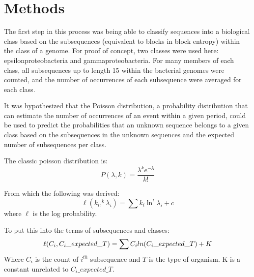 \documentclass[11pt, letterpaper, twocolumn]{article}
\begin{document}
   \section{Methods}
   The first step in this process was being able to classify sequences into a biological class based on the subsequences (equivalent to blocks in block entropy) within the class of a genome. For proof of concept, two classes were used here: epsilonproteobacteria and gammaproteobacteria. For many members of each class, all subsequences up to length 15 within the bacterial genomes were counted, and the number of occurrences of each subsequence were averaged for each class.
   
   It was hypothesized that the Poisson distribution, a probability distribution that can estimate the number of occurrences of an event within a given period, could be used to predict the probabilities that an unknown sequence belongs to a given class based on the subsequences in the unknown sequences and the expected number of subsequences per class.
   
   The classic poisson distribution is:
   \begin{equation}
   	P(\lambda, k)={\frac {\lambda ^{k}e^{-\lambda }}{k!}}
   \end{equation}


   From which the following was derived:
   \begin{equation}
   	\ell(k_{i}, ^k\lambda_{i}) = \sum k_{i}\ln ^t\lambda_{i} + c
   \end{equation}
   where $\ell$ is the log probability.
   
   To put this into the terms of subsequences and classes:
   \begin{equation}
   	\ell(C_i, C_i\_expected\_T) = \sum C_i ln(C_i\_expected\_T)  + K\newline
   \end{equation}
   Where $C_i$ is the count of $i^{th}$ subsequence and $T$ is the type of organism. K is a constant unrelated to $C_i\_expected\_T$.
   
\end{document}
